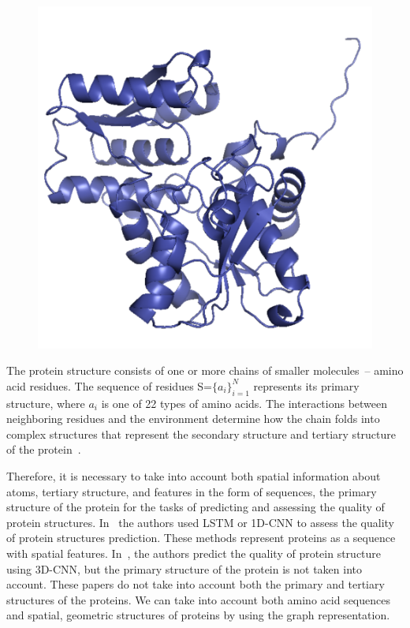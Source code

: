 \documentclass[12pt,twosides]{extarticle}
\begin{document}
\begin{figure}[H]
{		\includegraphics[scale=0.24]{model_T0861.pdf}}
	\label{fig:edge}
\end{figure}
The protein structure consists of one or more chains of smaller molecules~-- amino acid residues. The sequence of residues S=$\{a_i\}_{i = 1}^N $ represents its primary structure, where $a_i$ is one of 22 types of amino acids. The interactions between neighboring residues and the environment determine how the chain folds into complex structures that represent the secondary structure and tertiary structure of the protein~\cite{Baldassarre2019GraphQAPM}.

Therefore, it is necessary to take into account both spatial information about atoms, tertiary structure, and features in the form of sequences, the primary structure of the protein for the tasks of predicting and assessing the quality of protein structures. In~\cite{HurtadoQA, AngularQA} the authors used LSTM or 1D-CNN  to assess the quality of protein structures prediction. These methods represent proteins as a sequence with spatial features. In~\cite{3DCNN, 10.1093/bioinformatics/btz122},  the authors predict the quality of protein structure using 3D-CNN, but the primary structure of the protein is not taken into account. These papers do not take into account both the primary and tertiary structures of the proteins.  We can take into account both amino acid sequences and spatial, geometric structures of proteins by using the graph representation.
\end{document}
